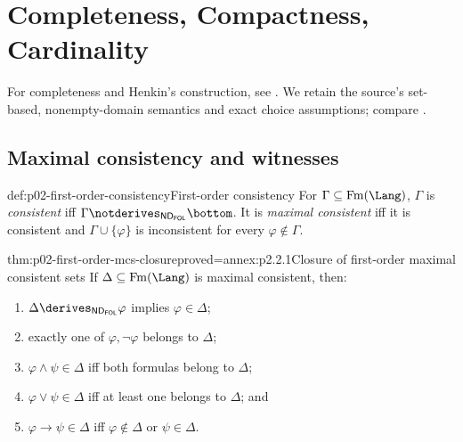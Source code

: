 
\chapter{Completeness, Compactness, Cardinality}
\label{sec:p02-first-order-completeness}

For completeness and Henkin's construction, see
\cite{Godel1930,Henkin1949}.  We retain the source's set-based,
nonempty-domain semantics and exact choice assumptions; compare
\cite{Hodges1993,Marker2002}.

\section{Maximal consistency and witnesses}
\label{sec:p02-first-order-henkin-preparation}

\begin{hbdefinition}{def:p02-first-order-consistency}{First-order consistency}
For \(\Gamma\subseteq\operatorname{Fm}(\Lang)\), \(\Gamma\) is
\emph{consistent} iff
\(\Gamma\notderives_{\mathsf{ND}_{\mathsf{FOL}}}\bottom\).  It is
\emph{maximal consistent} iff it is consistent and
\(\Gamma\cup\{\varphi\}\) is inconsistent for every
\(\varphi\notin\Gamma\).
\end{hbdefinition}

\begin{hblemma}{thm:p02-first-order-mcs-closure}{proved=annex:p2.2.1}{Closure of first-order maximal consistent sets}
If \(\Delta\subseteq\operatorname{Fm}(\Lang)\) is maximal consistent, then:
\begin{enumerate}
  \item \(\Delta\derives_{\mathsf{ND}_{\mathsf{FOL}}}\varphi\) implies
        \(\varphi\in\Delta\);
  \item exactly one of \(\varphi,\neg\varphi\) belongs to \(\Delta\);
  \item \(\varphi\land\psi\in\Delta\) iff both formulas belong to
        \(\Delta\);
  \item \(\varphi\lor\psi\in\Delta\) iff at least one belongs to
        \(\Delta\); and
  \item \(\varphi\to\psi\in\Delta\) iff
        \(\varphi\notin\Delta\) or \(\psi\in\Delta\).
\end{enumerate}
\end{hblemma}

